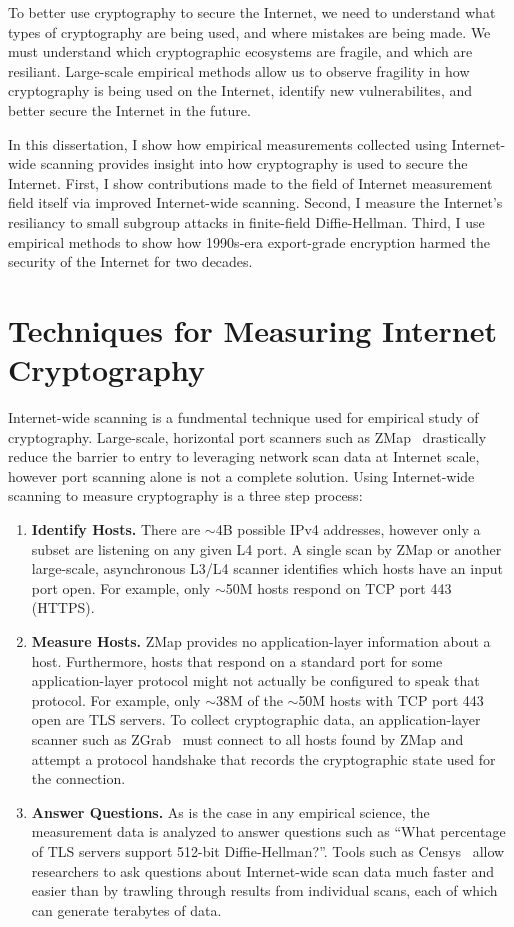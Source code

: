 To better use cryptography to secure the Internet, we need to understand what
types of cryptography are being used, and where mistakes are being made. We
must understand which cryptographic ecosystems are fragile, and which are
resiliant. Large-scale empirical methods allow us to observe fragility in
how cryptography is being used on the Internet, identify new vulnerabilites,
and better secure the Internet in the future.

In this dissertation, I show how empirical measurements collected using
Internet-wide scanning provides insight into how cryptography is used to
secure the Internet. First, I show contributions made to the field of
Internet measurement field itself via improved Internet-wide scanning.
Second, I measure the Internet's resiliancy to small subgroup attacks in
finite-field Diffie-Hellman. Third, I use empirical methods to show how
1990s-era export-grade encryption harmed the security of the Internet for two
decades.

\section{Techniques for Measuring Internet Cryptography}

Internet-wide scanning is a fundmental technique used for empirical study of
cryptography. Large-scale, horizontal port scanners such as
ZMap~\cite{zmap-2013} drastically reduce the barrier to entry to leveraging
network scan data at Internet scale, however port scanning alone is not a
complete solution. Using Internet-wide scanning to measure cryptography is a
three step process:
\begin{enumerate}
  \item \textbf{Identify Hosts.}
    There are $\sim$4B possible IPv4 addresses, however only a subset are
    listening on any given L4 port. A single scan by ZMap or another
    large-scale, asynchronous L3/L4 scanner identifies which hosts have an
    input port open. For example, only $\sim$50M hosts respond on TCP port 443
    (HTTPS).
  \item \textbf{Measure Hosts.}
    ZMap provides no application-layer information about a host. Furthermore,
    hosts that respond on a standard port for some application-layer protocol
    might not actually be configured to speak that protocol. For example,
    only $\sim$38M of the $\sim$50M hosts with TCP port 443 open are TLS
    servers. To collect cryptographic data, an application-layer scanner such
    as ZGrab~\cite{zgrab-github} must connect to all hosts found by ZMap and
    attempt a protocol handshake that records the cryptographic state used
    for the connection.
  \item \textbf{Answer Questions.}
    As is the case in any empirical science, the measurement data is analyzed
    to answer questions such as ``What percentage of TLS servers support
    512-bit Diffie-Hellman?''. Tools such as Censys~\cite{censys} allow
    researchers to ask questions about Internet-wide scan data much faster
    and easier than by trawling through results from individual scans, each
    of which can generate terabytes of data.
\end{enumerate}

